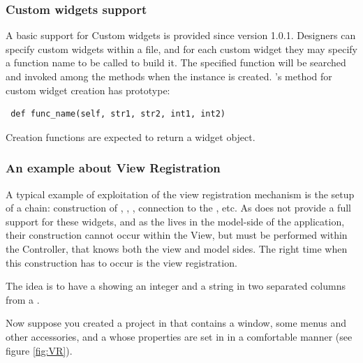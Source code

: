 \subsubsection{Custom widgets support}
A basic support for Custom widgets is provided since version 1.0.1.
Designers can specify custom widgets within a \glade file, and for
each custom widget they may specify a function name to be called to
build it. The specified function will be searched and invoked among
the  methods when the instance is
created. 's method for custom widget creation
has prototype:

{ \codesize 
\begin{verbatim}
 def func_name(self, str1, str2, int1, int2)
\end{verbatim}
}

Creation functions are expected to return a widget object.


\subsubsection{\label{VR:EX}An example about View Registration}
A typical example of exploitation of the view registration mechanism
is the setup of a  chain: construction of
, ,
, connection to the , etc.
As \glade does not provide a full support for these widgets, and as
the  lives in the model-side of the application,
their construction cannot occur within the View, but must be performed
within the Controller, that knows both the view and model sides. The
right time when this construction has to occur is the view
registration.

The idea is to have a  showing an integer and a
string in two separated columns from a .  

Now suppose you created a project in \glade that contains a window,
some menus and other accessories, and a  whose
properties are set in \glade in a comfortable manner (see figure
\ref{fig:VR}).

